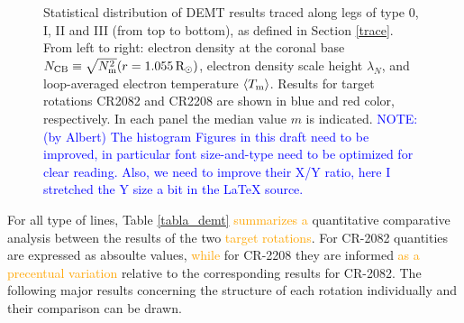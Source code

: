 \documentclass[namedreferences]{solarphysics}
\newcommand{\mrsun}{{\rm R_\odot}}
\newcommand{\lN}{\lambda_N}
\newcommand{\NCB}{N_{\rm CB}}
\newcommand{\Tm}{T_{\rm m}}
\newcommand{\aTm}{\left<\Tm\right>}
\newcommand{\Nsqm}{N^2_{{\rm m}}}
\newcommand{\sqravgN}{\sqrt{\Nsqm}}
\def\albert#1{\textcolor{orange}{#1}}
\def\notebyalbert#1{\textcolor{blue}{NOTE: #1}}
\begin{document}
\begin{article}
\begin{figure}[h!]
\begin{center}
\caption{{Statistical distribution of DEMT results traced along legs of type 0, I, II and III (from top to bottom), as defined in Section \ref{trace}. From left to right: electron density at the coronal base $\NCB\equiv\sqravgN(r=1.055\,\mrsun)$, electron density scale height $\lN$, and loop-averaged electron temperature $\aTm$. Results for target rotations CR2082 and CR2208 are shown in blue and red color, respectively. In each panel the median value $m$ is indicated.} \notebyalbert{ (by Albert) The histogram Figures in this draft need to be improved, in particular font size-and-type need to be optimized for clear reading. Also, we need to improve their X/Y ratio, here I stretched the Y size a bit in the LaTeX source.} }
\label{histos_fulldemt}
\end{center}
\end{figure} 

For all type of lines, Table \ref{tabla_demt} \albert{summarizes a} quantitative comparative analysis between the results of the two \albert{target rotations}. For CR-2082 quantities are expressed as absoulte values, \albert{while} for CR-2208 they are informed \albert{as a precentual variation} relative to the corresponding results for CR-2082. The following major results concerning the structure of each rotation individually and their comparison can be drawn.


\end{article}
\end{document}
